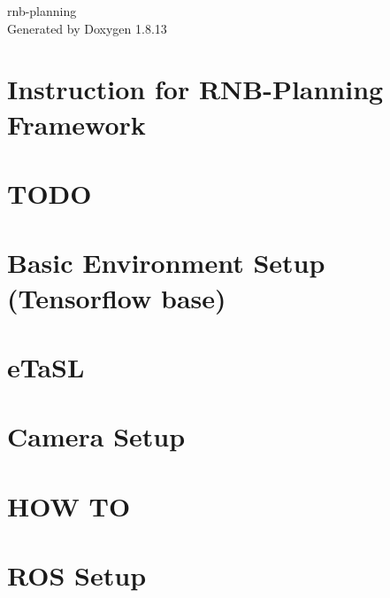 \documentclass[twoside]{book}
\newcommand{\+}{\discretionary{\mbox{\scriptsize$\hookleftarrow$}}{}{}}
\newcommand{\clearemptydoublepage}{%
  \newpage{\pagestyle{empty}\cleardoublepage}%
}
\begin{document}
\hypersetup{pageanchor=false,
             bookmarksnumbered=true,
             pdfencoding=unicode
            }
\begin{titlepage}
\vspace*{7cm}
\begin{center}%
{\Large rnb-\/planning }\\
\vspace*{1cm}
{\large Generated by Doxygen 1.8.13}\\
\end{center}
\end{titlepage}
\clearemptydoublepage
{}
\tableofcontents
\clearemptydoublepage
{}
\hypersetup{pageanchor=true}

\chapter{Instruction for R\+N\+B-\/\+Planning Framework}
\label{index}\hypertarget{index}{}
\chapter{T\+O\+DO}
\label{md_docs_dev_log}

\chapter{Basic Environment Setup (Tensorflow base)}
\label{md_docs__e_n_v_i_r_o_n_m_e_n_t}

\chapter{e\+Ta\+SL}
\label{md_docs__e_t_a_s_l__s_e_t_u_p}

\chapter{Camera Setup}
\label{md_docs__h_a_r_d_w_a_r_e__s_e_t_u_p}

\chapter{H\+OW TO}
\label{md_docs__h_o_w__t_o}

\chapter{R\+OS Setup}
\label{md_docs__r_o_s__s_e_t_u_p}

\end{document}
